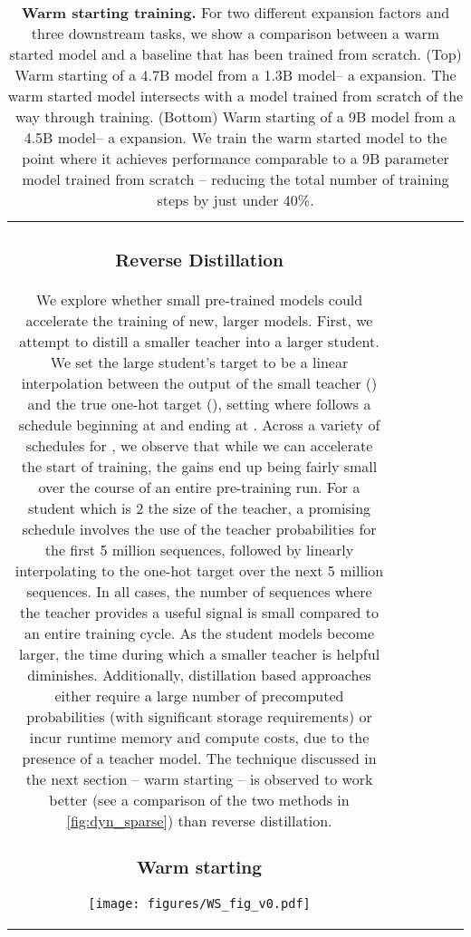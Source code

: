 \documentclass[11pt, a4paper, logo, internal, copyright, nonumbering]{deepmind}
\begin{document}
\begin{center}
\begin{longtable}{cclccc}
{\subsubsection{Reverse Distillation}
We explore whether small pre-trained models could accelerate the training of new, larger models.
First, we attempt to distill a smaller teacher into a larger student.
We set the large student's target to be a linear interpolation between the output of the small teacher () and the true one-hot target (), setting  where  follows a schedule beginning at  and ending at . 
Across a variety of schedules for , we observe that while we can accelerate the start of training, the gains end up being fairly small over the course of an entire pre-training run.
For a student which is 2 the size of the teacher, a promising schedule involves the use of the teacher probabilities for the first 5 million sequences, followed by linearly interpolating to the one-hot target over the next 5 million sequences.
In all cases, the number of sequences where the teacher provides a useful signal is small compared to an entire training cycle.
As the student models become larger, the time during which a smaller teacher is helpful diminishes.
Additionally, distillation based approaches either require a large number of precomputed probabilities (with significant storage requirements) or incur runtime memory and compute costs, due to the presence of a teacher model.
The technique discussed in the next section -- warm starting -- is observed to work better (see a comparison of the two methods in \autoref{fig:dyn_sparse}) than reverse distillation.

\subsubsection{Warm starting}
\label{app:warm_start}

\begin{figure*}[t]
    \centering
    \texttt{[image: figures/WS\_fig\_v0.pdf]}
    \caption{\textbf{Warm starting training.}
    For two different expansion factors and three downstream tasks, we show a comparison between a warm started model and a baseline that has been trained from scratch.
    (Top) Warm starting of a 4.7B model from a 1.3B model-- a  expansion.
    The warm started model intersects with a model trained from scratch  of the way through training.
    (Bottom) Warm starting of a 9B model from a 4.5B model-- a  expansion.
    We train the warm started model to the point where it achieves performance comparable to a 9B parameter model trained from scratch -- reducing the total number of training steps by just under 40\%.
    }
    \label{fig:ws_49}
\end{figure*}

}
\end{longtable}
\end{center}
\end{document}
